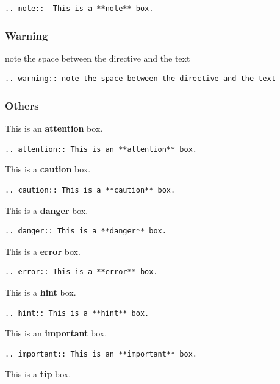 \begin{verbatim}
.. note::  This is a **note** box.
\end{verbatim}

\subsubsection{Warning}\label{warning}

note the space between the directive and the text

\begin{verbatim}
.. warning:: note the space between the directive and the text
\end{verbatim}

\subsubsection{Others}\label{others}

This is an \textbf{attention} box.

\begin{verbatim}
.. attention:: This is an **attention** box.
\end{verbatim}

This is a \textbf{caution} box.

\begin{verbatim}
.. caution:: This is a **caution** box.
\end{verbatim}

This is a \textbf{danger} box.

\begin{verbatim}
.. danger:: This is a **danger** box.
\end{verbatim}

This is a \textbf{error} box.

\begin{verbatim}
.. error:: This is a **error** box.
\end{verbatim}

This is a \textbf{hint} box.

\begin{verbatim}
.. hint:: This is a **hint** box.
\end{verbatim}

This is an \textbf{important} box.

\begin{verbatim}
.. important:: This is an **important** box.
\end{verbatim}

This is a \textbf{tip} box.

